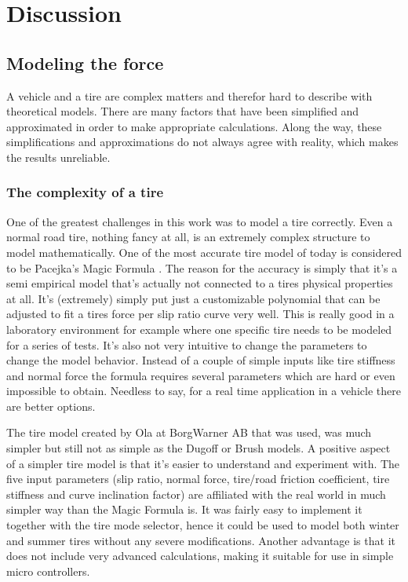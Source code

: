 \chapter{Discussion}

\section{Modeling the force}
A vehicle and a tire are complex matters and therefor hard to describe with theoretical models. There are many factors that have been simplified and approximated in order to make appropriate calculations. Along the way, these simplifications and approximations do not always agree with reality, which makes the results unreliable. 

\subsection{The complexity of a tire}
One of the greatest challenges in this work was to model a tire correctly. Even a normal road tire, nothing fancy at all, is an extremely complex structure to model mathematically. One of the most accurate tire model of today is considered to be Pacejka's Magic Formula \cite{pacejka}. The reason for the accuracy is simply that it's a semi empirical model that's actually not connected to a tires physical properties at all. It's (extremely) simply put just a customizable polynomial that can be adjusted to fit a tires force per slip ratio curve very well. This is really good in a laboratory environment for example where one specific tire needs to be modeled for a series of tests. It's also not very intuitive to change the parameters to change the model behavior. Instead of a couple of simple inputs like tire stiffness and normal force the formula requires several parameters which are hard or even impossible to obtain. Needless to say, for a real time application in a vehicle there are better options.

The tire model created by Ola at BorgWarner AB that was used, was much simpler but still not as simple as the Dugoff or Brush models. A positive aspect of a simpler tire model is that it's easier to understand and experiment with. The five input parameters (slip ratio, normal force, tire/road friction coefficient, tire stiffness and curve inclination factor) are affiliated with the real world in much simpler way than the Magic Formula is. It was fairly easy to implement it together with the tire mode selector, hence it could be used to model both winter and summer tires without any severe modifications. Another advantage is that it does not include very advanced calculations, making it suitable for use in simple micro controllers. 

